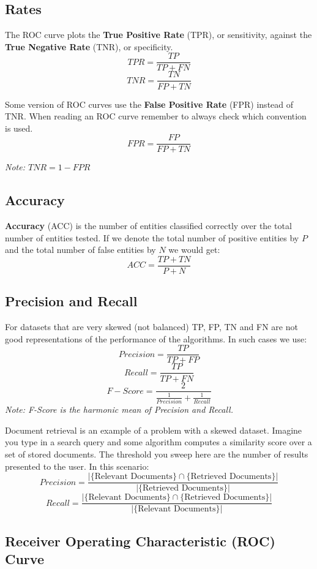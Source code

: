 \documentclass[a4paper]{article}
\begin{document}
\subsection{Rates}
The ROC curve plots the \textbf{True Positive Rate} (TPR), or sensitivity, against the \textbf{True Negative Rate} (TNR), or specificity.
$$TPR = \frac{TP}{TP + FN}$$
$$TNR = \frac{TN}{FP + TN}$$

Some version of ROC curves use the \textbf{False Positive Rate} (FPR) instead of TNR. When reading an ROC curve remember to always check which convention is used.
$$FPR = \frac{FP}{FP + TN}$$

\textit{Note: $TNR = 1-FPR$}\vspace{2mm}
\newline


\subsection{Accuracy}
\textbf{Accuracy} (ACC) is the number of entities classified correctly over the total number of entities tested. If we denote the total number of positive entities by $P$ and the total number of false entities by $N$ we would get:
$$ACC = \frac{TP+TN}{P+N}$$


\subsection{Precision and Recall}
For datasets that are very skewed (not balanced) TP, FP, TN and FN are not good representations of the performance of the algorithms. In such cases we use:
$$Precision = \frac{TP}{TP+FP}$$
$$Recall = \frac{TP}{TP+FN}$$
$$F-Score = \frac{2}{\frac{1}{Precision}+\frac{1}{Recall}}$$
\textit{Note: F-Score is the harmonic mean of Precision and Recall.}\vspace{2mm}

Document retrieval is an example of a problem with a skewed dataset. Imagine you type in a search query and some algorithm computes a similarity score over a set of stored documents. The threshold you sweep here are the number of results presented to the user. In this scenario:
$$Precision = \frac{|\{\text{Relevant Documents}\}\cap\{\text{Retrieved Documents}\}|}{|\{\text{Retrieved Documents}\}|}$$
$$Recall = \frac{|\{\text{Relevant Documents}\}\cap\{\text{Retrieved Documents}\}|}{|\{\text{Relevant Documents}\}|}$$



\subsection{Receiver Operating Characteristic (ROC) Curve}
\end{document}
